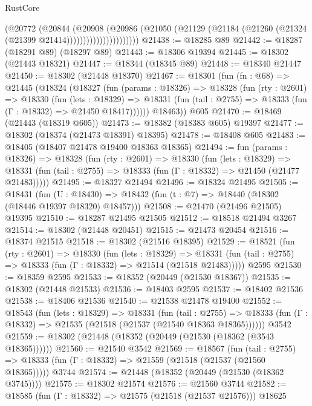 \begin{lexlean}{RustCore}
\begin{coremodule}
                            (@20772
                              (@20844
                                (@20908
                                  (@20986
                                    (@21050
                                      (@21129
                                        (@21184 (@21260 (@21324 (@21399 @21414))))))))))))))))))))))
@21438 := @18285 @89
@21442 := @18287 (@18291 @89) (@18297 @89)
@21443 := @18306 @19394
@21445 := @18302 (@21443 @18321)
@21447 := @18344 (@18345 @89)
@21448 := @18340 @21447
@21450 := @18302 (@21448 @18370)
@21467 := @18301
    (fun (fn : @68) =>
    @21445
      (@18324
        (@18327
          (fun (params : @18326) =>
          @18328
            (fun (rty : @2601) =>
            @18330
              (fun (lets : @18329) =>
              @18331 (fun (tail : @2755) => @18333 (fun (Γ : @18332) => @21450 @18417))))))
        @18463))
    @605
@21470 := @18469 (@21443 (@18319 @605))
@21473 := @18382 (@18383 @605) @19397
@21477 := @18302 (@18374 (@21473 @18391) @18395)
@21478 := @18408 @605
@21483 := @18405 (@18407 @21478 @19400 @18363 @18365)
@21494 := fun (params : @18326) =>
  @18328
    (fun (rty : @2601) =>
    @18330
      (fun (lets : @18329) =>
      @18331 (fun (tail : @2755) => @18333 (fun (Γ : @18332) => @21450 (@21477 @21483)))))
@21495 := @18327 @21494
@21496 := @18324 @21495
@21505 := @18431
    (fun (U : @18430) => @18432 (fun (t : @7) => @18440 (@18302 (@18446 @19397 @18320) @18457)))
@21508 := @21470 (@21496 @21505) @19395
@21510 := @18287 @21495 @21505
@21512 := @18518 @21494 @3267
@21514 := @18302 (@21448 @20451)
@21515 := @21473 @20454
@21516 := @18374 @21515
@21518 := @18302 (@21516 @18395)
@21529 := @18521
    (fun (rty : @2601) =>
    @18330
      (fun (lets : @18329) =>
      @18331 (fun (tail : @2755) => @18333 (fun (Γ : @18332) => @21514 (@21518 @21483)))))
    @2595
@21530 := @18359 @2595
@21533 := @18352 (@20449 (@21530 @18367))
@21535 := @18302 (@21448 @21533)
@21536 := @18403 @2595
@21537 := @18402 @21536
@21538 := @18406 @21536
@21540 := @21538 @21478 @19400
@21552 := @18543
    (fun (lets : @18329) =>
    @18331
      (fun (tail : @2755) =>
      @18333 (fun (Γ : @18332) => @21535 (@21518 (@21537 (@21540 @18363 @18365))))))
    @3542
@21559 := @18302 (@21448 (@18352 (@20449 (@21530 (@18362 (@3543 @18365))))))
@21560 := @21540 @3542
@21569 := @18567
    (fun (tail : @2755) => @18333 (fun (Γ : @18332) => @21559 (@21518 (@21537 (@21560 @18365)))))
    @3744
@21574 := @21448 (@18352 (@20449 (@21530 (@18362 @3745))))
@21575 := @18302 @21574
@21576 := @21560 @3744
@21582 := @18585 (fun (Γ : @18332) => @21575 (@21518 (@21537 @21576))) @18625

\end{coremodule}
\end{lexlean}
